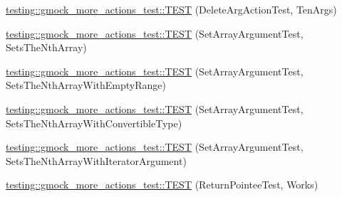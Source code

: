 \begin{DoxyCompactItemize}
\item 
\mbox{\hyperlink{namespacetesting_1_1gmock__more__actions__test_a972b47a7e96b95606190afa928ea2db4}{testing\+::gmock\+\_\+more\+\_\+actions\+\_\+test\+::\+T\+E\+ST}} (Delete\+Arg\+Action\+Test, Ten\+Args)
\item 
\mbox{\hyperlink{namespacetesting_1_1gmock__more__actions__test_aacf568e3d16b210aa2316ccc2cb6b22d}{testing\+::gmock\+\_\+more\+\_\+actions\+\_\+test\+::\+T\+E\+ST}} (Set\+Array\+Argument\+Test, Sets\+The\+Nth\+Array)
\item 
\mbox{\hyperlink{namespacetesting_1_1gmock__more__actions__test_a63a338ef41086b80dba5729ecd1073e5}{testing\+::gmock\+\_\+more\+\_\+actions\+\_\+test\+::\+T\+E\+ST}} (Set\+Array\+Argument\+Test, Sets\+The\+Nth\+Array\+With\+Empty\+Range)
\item 
\mbox{\hyperlink{namespacetesting_1_1gmock__more__actions__test_a42955fc99954c095f9d7ded3b92c091f}{testing\+::gmock\+\_\+more\+\_\+actions\+\_\+test\+::\+T\+E\+ST}} (Set\+Array\+Argument\+Test, Sets\+The\+Nth\+Array\+With\+Convertible\+Type)
\item 
\mbox{\hyperlink{namespacetesting_1_1gmock__more__actions__test_a5db6a5413414f6d9bb8a24d1f07bf882}{testing\+::gmock\+\_\+more\+\_\+actions\+\_\+test\+::\+T\+E\+ST}} (Set\+Array\+Argument\+Test, Sets\+The\+Nth\+Array\+With\+Iterator\+Argument)
\item 
\mbox{\hyperlink{namespacetesting_1_1gmock__more__actions__test_a690ef20bd9c281781eddcf99b18cff6c}{testing\+::gmock\+\_\+more\+\_\+actions\+\_\+test\+::\+T\+E\+ST}} (Return\+Pointee\+Test, Works)
\end{DoxyCompactItemize}
